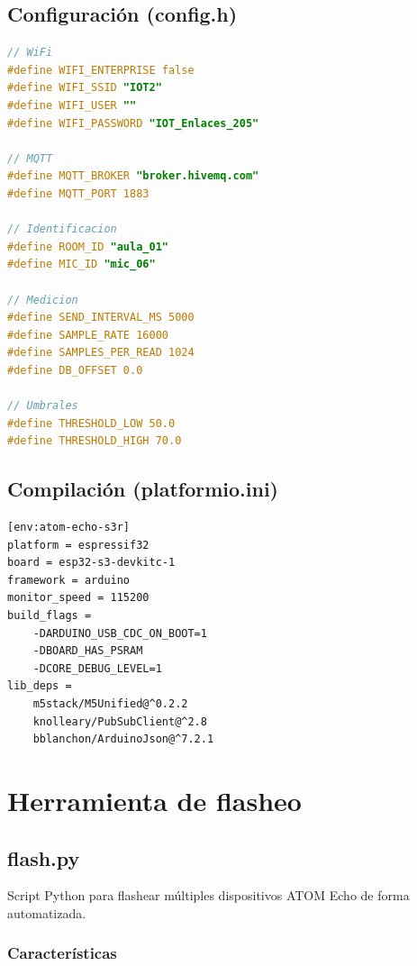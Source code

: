 \documentclass[12pt,a4paper]{report}
\begin{document}
\section{Configuraci\'on (config.h)}

\begin{lstlisting}[language=C, caption={Archivo de configuraci\'on completo}]
// WiFi
#define WIFI_ENTERPRISE false
#define WIFI_SSID "IOT2"
#define WIFI_USER ""
#define WIFI_PASSWORD "IOT_Enlaces_205"

// MQTT
#define MQTT_BROKER "broker.hivemq.com"
#define MQTT_PORT 1883

// Identificacion
#define ROOM_ID "aula_01"
#define MIC_ID "mic_06"

// Medicion
#define SEND_INTERVAL_MS 5000
#define SAMPLE_RATE 16000
#define SAMPLES_PER_READ 1024
#define DB_OFFSET 0.0

// Umbrales
#define THRESHOLD_LOW 50.0
#define THRESHOLD_HIGH 70.0
\end{lstlisting}

\section{Compilaci\'on (platformio.ini)}

\begin{lstlisting}[caption={Configuraci\'on PlatformIO para ATOM Echo S3R}]
[env:atom-echo-s3r]
platform = espressif32
board = esp32-s3-devkitc-1
framework = arduino
monitor_speed = 115200
build_flags =
    -DARDUINO_USB_CDC_ON_BOOT=1
    -DBOARD_HAS_PSRAM
    -DCORE_DEBUG_LEVEL=1
lib_deps =
    m5stack/M5Unified@^0.2.2
    knolleary/PubSubClient@^2.8
    bblanchon/ArduinoJson@^7.2.1
\end{lstlisting}

\chapter{Herramienta de flasheo}

\section{flash.py}

Script Python para flashear m\'ultiples dispositivos ATOM Echo de forma automatizada.

\subsection{Caracter\'isticas}
\end{document}
